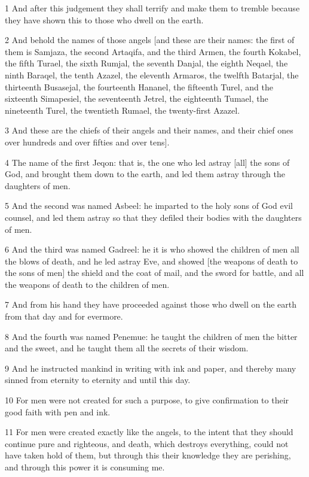 \par 1 And after this judgement they shall terrify and make them to tremble because they have shown this to those who dwell on the earth.
\par 2 And behold the names of those angels [and these are their names: the first of them is Samjaza, the second Artaqifa, and the third Armen, the fourth Kokabel, the fifth Turael, the sixth Rumjal, the seventh Danjal, the eighth Neqael, the ninth Baraqel, the tenth Azazel, the eleventh Armaros, the twelfth Batarjal, the thirteenth Busasejal, the fourteenth Hananel, the fifteenth Turel, and the sixteenth Simapesiel, the seventeenth Jetrel, the eighteenth Tumael, the nineteenth Turel, the twentieth Rumael, the twenty-first Azazel.
\par 3 And these are the chiefs of their angels and their names, and their chief ones over hundreds and over fifties and over tens].
\par 4 The name of the first Jeqon: that is, the one who led astray [all] the sons of God, and brought them down to the earth, and led them astray through the daughters of men.
\par 5 And the second was named Asbeel: he imparted to the holy sons of God evil counsel, and led them astray so that they defiled their bodies with the daughters of men.
\par 6 And the third was named Gadreel: he it is who showed the children of men all the blows of death, and he led astray Eve, and showed [the weapons of death to the sons of men] the shield and the coat of mail, and the sword for battle, and all the weapons of death to the children of men.
\par 7 And from his hand they have proceeded against those who dwell on the earth from that day and for evermore.
\par 8 And the fourth was named Penemue: he taught the children of men the bitter and the sweet, and he taught them all the secrets of their wisdom.
\par 9 And he instructed mankind in writing with ink and paper, and thereby many sinned from eternity to eternity and until this day.
\par 10 For men were not created for such a purpose, to give confirmation to their good faith with pen and ink.
\par 11 For men were created exactly like the angels, to the intent that they should continue pure and righteous, and death, which destroys everything, could not have taken hold of them, but through this their knowledge they are perishing, and through this power it is consuming me.
